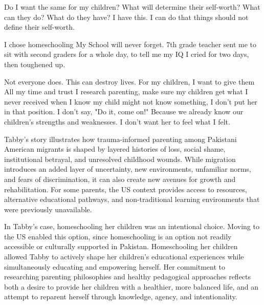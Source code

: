 \begin{FoundPoem}
        Do I want the same for my children?
 What will determine their self-worth? 
What can they do? 		 What do they have?
        I have this. 		
 I can do that				
            things should not define their self-worth.

                               I chose homeschooling 
        My School
        will never forget.
                    7th grade 
        teacher  sent me to sit
        with second graders
        for a whole day,
        to tell me my IQ  
             I cried for two days,
        then 
                toughened up.

        Not everyone does.
                        This can destroy lives.
        For my children, I want to give them
        All my time and trust
        I research parenting, 
	       make sure           my children get what
        I never received
        when I know             my child might not know something, 
        I don't put her in that position. 
        I don't say,
          "Do it, come on!"
        Because we already know our children's
        strengths and weaknesses. 
        I don’t want her to feel
          what I felt.
\end{FoundPoem}

Tabby's story illustrates how trauma-informed parenting among Pakistani American migrants is shaped by layered histories of loss, social shame, institutional betrayal, and unresolved childhood wounds. While migration introduces an added layer of uncertainty, new environments, unfamiliar norms, and fears of discrimination, it can also create new avenues for growth and rehabilitation. For some parents, the US context provides access to resources, alternative educational pathways, and non-traditional learning environments that were previously unavailable.

In Tabby's case, homeschooling her children was an intentional choice. Moving to the US enabled this option, since homeschooling is an option not readily accessible or culturally supported in Pakistan. Homeschooling her children allowed Tabby to actively shape her children’s educational experiences while simultaneously educating and empowering herself. Her commitment to researching parenting philosophies and healthy pedagogical approaches reflects both a desire to provide her children with a healthier, more balanced life, and an attempt to reparent herself through knowledge, agency, and intentionality.

